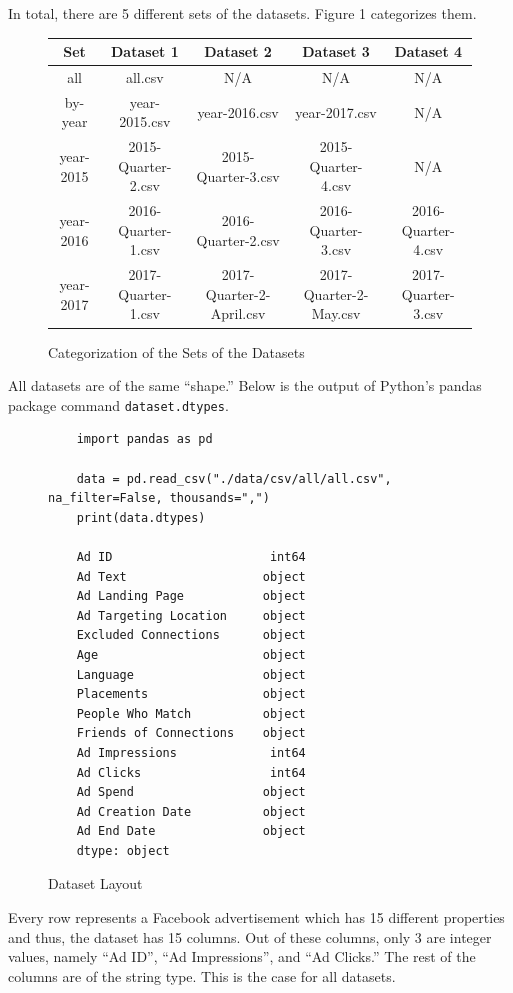 \documentclass{article}
\begin{document}
\medskip

In total, there are 5 different sets of the datasets.
Figure 1 categorizes them.

\begin{figure}[H]
  \centering
  \begin{tabular}{*{5}{c}}
    \toprule
    Set & Dataset 1 & Dataset 2 & Dataset 3 & Dataset 4\\
    \midrule
    all  & all.csv & N/A & N/A & N/A\\
    \midrule
    by-year & year-2015.csv & year-2016.csv & year-2017.csv & N/A\\
    \midrule
    year-2015 & 2015-Quarter-2.csv & 2015-Quarter-3.csv & 2015-Quarter-4.csv & N/A\\
    \midrule
    year-2016 & 2016-Quarter-1.csv & 2016-Quarter-2.csv & 2016-Quarter-3.csv & 2016-Quarter-4.csv\\
    \midrule
    year-2017 & 2017-Quarter-1.csv & 2017-Quarter-2-April.csv & 2017-Quarter-2-May.csv & 2017-Quarter-3.csv\\
    \bottomrule
  \end{tabular}
  \caption{Categorization of the Sets of the Datasets}
\end{figure}

All datasets are of the same ``shape.'' Below is the output of Python's pandas
package command \texttt{dataset.dtypes}.

\begin{figure}[H]
  \begin{verbatim}
    import pandas as pd

    data = pd.read_csv("./data/csv/all/all.csv", na_filter=False, thousands=",")
    print(data.dtypes)

    Ad ID                      int64
    Ad Text                   object
    Ad Landing Page           object
    Ad Targeting Location     object
    Excluded Connections      object
    Age                       object
    Language                  object
    Placements                object
    People Who Match          object
    Friends of Connections    object
    Ad Impressions             int64
    Ad Clicks                  int64
    Ad Spend                  object
    Ad Creation Date          object
    Ad End Date               object
    dtype: object
  \end{verbatim}
  \caption{Dataset Layout}
\end{figure}

Every row represents a Facebook advertisement which has 15 different properties
and thus, the dataset has 15 columns. Out of these columns, only 3 are integer
values, namely ``Ad ID'', ``Ad Impressions'', and ``Ad Clicks.'' The rest of
the columns are of the string type. This is the case for all datasets.
\end{document}
